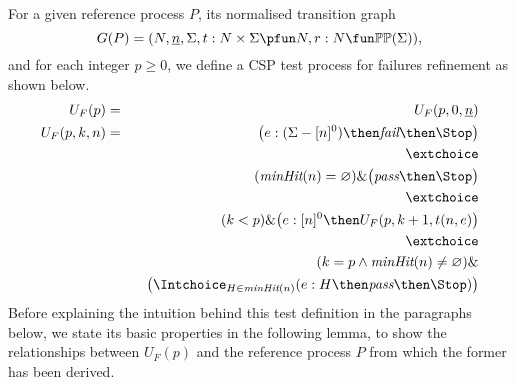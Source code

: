 For a given reference process $P$, its normalised transition graph 
$$
G(P) = ( N, \ii n, \Sigma, t : N\times\Sigma \pfun N, r : N \fun \mathbb{P}\mathbb{P}(\Sigma)),
$$ 
and for each integer $p\ge 0$, we define a
CSP test process for failures refinement as shown below.
%
%
\begin{eqnarray}
U_F(p) & = & U_F(p,0,\ii n)
\\
U_F(p,k,n) & = & \big(e:(\Sigma - [n]^0)  \then \efail\then \Stop \big)
\label{eq:ufa}
\\ & & \extchoice \nonumber
\\ & & (\minhits(n) =   \varnothing  )    \&   \big( \epass \then \Stop \big)
\label{eq:ufb}
\\ & & \extchoice \nonumber
\\ & & (k < p) \& \big(e:[n]^0   \then U_F(p,k+1,t(n,e) \big)
\label{eq:ufc}
\\ & & \extchoice \nonumber
\\ & & (k = p \wedge \minhits(n)\neq\varnothing) \&  \nonumber 
\\ & & \taba \big( \Intchoice_{H\in\minhits(n)} (e:H   \then \epass \then\Stop   )  \big)
\label{eq:ufd}
\end{eqnarray}
%
Before explaining the intuition behind this test definition in the paragraphs below,
we state its basic properties in the following lemma, to show the relationships between
$U_F(p)$ and the reference process $P$ from which the former has been derived.


